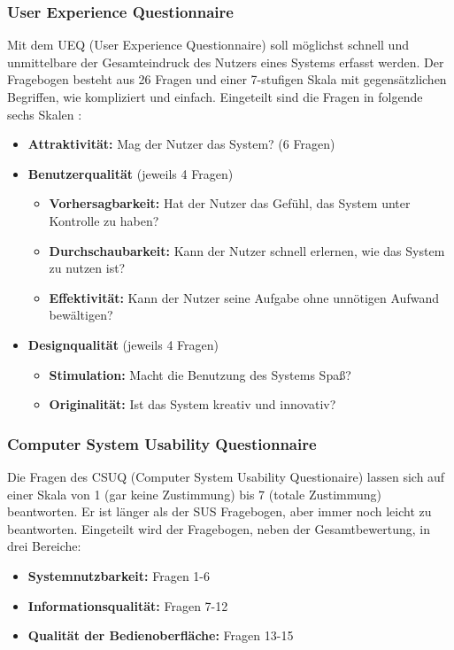 \subsubsection*{User Experience Questionnaire}
Mit dem UEQ (User Experience Questionnaire) soll möglichst schnell und unmittelbare der Gesamteindruck des Nutzers eines Systems erfasst werden. Der Fragebogen besteht aus 26 Fragen und einer 7-stufigen Skala mit gegensätzlichen Begriffen, wie kompliziert und einfach. Eingeteilt sind die Fragen in folgende sechs Skalen \cite{} :
\begin{itemize}
\item \textbf{Attraktivität:} Mag der Nutzer das System? (6 Fragen)
\item \textbf{Benutzerqualität} (jeweils 4 Fragen)
	\begin{itemize}
	\item \textbf{Vorhersagbarkeit:} Hat der Nutzer das Gefühl, das System unter Kontrolle zu haben?
	\item \textbf{Durchschaubarkeit:} Kann der Nutzer schnell erlernen, wie das System zu nutzen ist?
	\item \textbf{Effektivität:} Kann der Nutzer seine Aufgabe ohne unnötigen Aufwand bewältigen?
	\end{itemize}
\item \textbf{Designqualität} (jeweils 4 Fragen)
	\begin{itemize}
	\item \textbf{Stimulation:} Macht die Benutzung des Systems Spaß?
	\item \textbf{Originalität:} Ist das System kreativ und innovativ?
	\end{itemize}
\end{itemize}

\subsubsection*{Computer System Usability Questionnaire}
Die Fragen des CSUQ (Computer System Usability Questionaire) lassen sich auf einer Skala von 1 (gar keine Zustimmung) bis 7 (totale Zustimmung) beantworten. Er ist länger als der SUS Fragebogen, aber immer noch leicht zu beantworten. Eingeteilt wird der Fragebogen, neben der Gesamtbewertung, in drei Bereiche: 
\begin{itemize}
\item \textbf{Systemnutzbarkeit:} Fragen 1-6
\item \textbf{Informationsqualität:} Fragen 7-12
\item \textbf{Qualität der Bedienoberfläche:} Fragen 13-15
\end{itemize}

